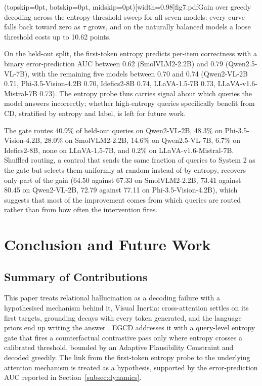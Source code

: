 \documentclass{ieeeaccess}
\begin{document}
\Figure[!ht](topskip=0pt, botskip=0pt, midskip=0pt)[width=0.98\columnwidth]{fig7.pdf}{Gain over greedy decoding across the entropy-threshold sweep for all seven models: every curve falls back toward zero as $\tau$ grows, and on the naturally balanced models a loose threshold costs up to 10.62 points.\label{fig:all}}

On the held-out split, the first-token entropy predicts per-item correctness with a binary error-prediction AUC between 0.62 (SmolVLM2-2.2B) and 0.79 (Qwen2.5-VL-7B), with the remaining five models between 0.70 and 0.74 (Qwen2-VL-2B 0.71, Phi-3.5-Vision-4.2B 0.70, Idefics2-8B 0.74, LLaVA-1.5-7B 0.73, LLaVA-v1.6-Mistral-7B 0.73). The entropy probe thus carries signal about which queries the model answers incorrectly; whether high-entropy queries specifically benefit from CD, stratified by entropy and label, is left for future work.

The gate routes 40.9\% of held-out queries on Qwen2-VL-2B, 48.3\% on Phi-3.5-Vision-4.2B, 28.0\% on SmolVLM2-2.2B, 14.6\% on Qwen2.5-VL-7B, 6.7\% on Idefics2-8B, none on LLaVA-1.5-7B, and 0.2\% on LLaVA-v1.6-Mistral-7B. Shuffled routing, a control that sends the same fraction of queries to System 2 as the gate but selects them uniformly at random instead of by entropy, recovers only part of the gain (64.50 against 67.33 on SmolVLM2-2.2B, 73.41 against 80.45 on Qwen2-VL-2B, 72.79 against 77.11 on Phi-3.5-Vision-4.2B), which suggests that most of the improvement comes from which queries are routed rather than from how often the intervention fires.

\section{Conclusion and Future Work}\label{sec:conclusion}

\subsection{Summary of Contributions}\label{subsec:summary}

This paper treats relational hallucination as a decoding failure with a hypothesised mechanism behind it, Visual Inertia: cross-attention settles on its first targets, grounding decays with every token generated, and the language priors end up writing the answer \cite{gong2026attention}. EGCD addresses it with a query-level entropy gate that fires a counterfactual contrastive pass only where entropy crosses a calibrated threshold, bounded by an Adaptive Plausibility Constraint and decoded greedily. The link from the first-token entropy probe to the underlying attention mechanism is treated as a hypothesis, supported by the error-prediction AUC reported in Section~\ref{subsec:dynamics}.
\end{document}
